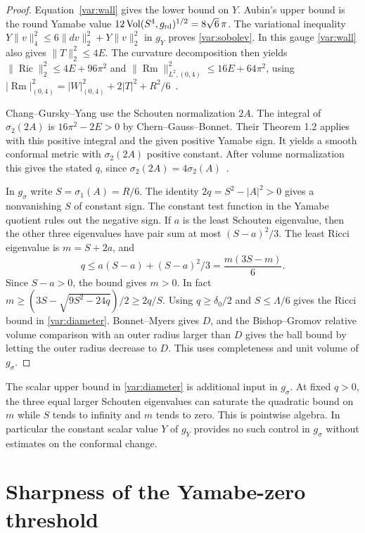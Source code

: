 \documentclass[11pt]{article}
\numberwithin{equation}{section}
\theoremstyle{definition}
\theoremstyle{remark}
\begin{document}
\begin{proof}
Equation~\eqref{var:wall} gives the lower bound on \(Y\).
Aubin's upper bound is the round Yamabe value
\(12\operatorname{Vol}(S^4,g_{\rm rd})^{1/2}=8\sqrt6\,\pi\).
The variational inequality
\(Y\|v\|_4^2\le6\|dv\|_2^2+Y\|v\|_2^2\)
in \(g_Y\) proves \eqref{var:sobolev}.
In this gauge \eqref{var:wall} also gives \(\|T\|_2^2\le4E\).
The curvature decomposition then yields
\(\|\operatorname{Ric}\|_2^2\le4E+96\pi^2\) and
\(\|\operatorname{Rm}\|_{L^2,(0,4)}^2\le16E+64\pi^2\), using
\(|\operatorname{Rm}|_{(0,4)}^2=|W|_{(0,4)}^2+2|T|^2+R^2/6\)~\cite[\S\S2--3]{LeeParker1987Yamabe}.

Chang--Gursky--Yang use the Schouten normalization \(2A\).
The integral of \(\sigma_2(2A)\) is \(16\pi^2-2E>0\) by
Chern--Gauss--Bonnet. Their Theorem 1.2 applies with this positive
integral and the given positive Yamabe sign. It yields a smooth
conformal metric with \(\sigma_2(2A)\) positive constant.
After volume normalization this gives the stated \(q\), since
\(\sigma_2(2A)=4\sigma_2(A)\)~\cite[\S1, (1.1) and Theorem 1.2]{ChangGurskyYang2003}.

In \(g_\sigma\) write \(S=\sigma_1(A)=R/6\). The identity
\(2q=S^2-|A|^2>0\) gives a nonvanishing \(S\) of constant sign.
The constant test function in the Yamabe quotient rules out
the negative sign. If \(a\) is the least Schouten eigenvalue,
then the other three eigenvalues have pair sum at most
\((S-a)^2/3\). The least Ricci eigenvalue is \(m=S+2a\), and
\[
 q\le a(S-a)+(S-a)^2/3=\frac{m(3S-m)}6 .
\]
Since \(S-a>0\), the bound gives \(m>0\). In fact
\(m\ge(3S-\sqrt{9S^2-24q})/2\ge2q/S\).
Using \(q\ge\delta_0/2\) and \(S\le\Lambda/6\) gives the Ricci
bound in \eqref{var:diameter}. Bonnet--Myers gives \(D\), and
the Bishop--Gromov relative volume comparison with an outer
radius larger than \(D\) gives the ball bound by letting the
outer radius decrease to \(D\). This uses completeness and unit
volume of \(g_\sigma\).
\end{proof}

The scalar upper bound in \eqref{var:diameter} is additional
input in \(g_\sigma\). At fixed \(q>0\), the three equal larger
Schouten eigenvalues can saturate the quadratic bound on \(m\)
while \(S\) tends to infinity and \(m\) tends to zero. This is
pointwise algebra. In particular the constant scalar value \(Y\)
of \(g_Y\) provides no such control in \(g_\sigma\) without
estimates on the conformal change.

\section{Sharpness of the Yamabe-zero threshold}\label{sec:wall}
\end{document}

